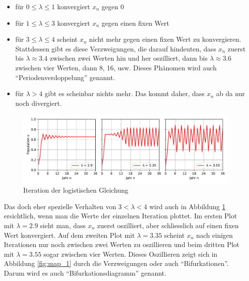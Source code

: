 \begin{itemize}
    \item 
    für $0 \le \lambda \le 1$ konvergiert $x_n$ gegen 0
    \item 
    für $1 \le \lambda \le 3$ konvergiert $x_n$ gegen einen fixen Wert
    \item 
    für $3 \le \lambda \le 4$ scheint $x_n$ nicht mehr gegen einen fixen Wert zu konvergieren.
    Stattdessen gibt es diese Verzweigungen, 
    die darauf hindeuten, 
    dass $x_n$ zuerst bis $\lambda \approx 3.4$ zwischen zwei Werten hin und her oszilliert, 
    dann bis $\lambda \approx 3.6$ zwischen vier Werten, dann 8, 16, usw. 
    Dieses Phänomen wird auch ``Periodenverdoppelung'' genannt.
    \item
    für $\lambda > 4$ gibt es scheinbar nichts mehr.
    Das kommt daher, dass $x_n$ ab da nur noch divergiert.  
\end{itemize}
\begin{figure}
    \includegraphics[width=\linewidth]{papers/logistic/figures/pop_logistic_2.pdf}
    \caption{Iteration der logistischen Gleichung}
    \label{fig:pop_logistic_2}
\end{figure}
Das doch eher spezielle Verhalten von $3 < \lambda < 4$ wird 
auch in Abbildung \ref{fig:pop_logistic_2} ersichtlich,
wenn man die Werte der einzelnen Iteration plottet.
Im ersten Plot mit $\lambda = 2.9$ sieht man, dass $x_n$ zuerst oszilliert,
aber schliesslich auf einen fixen Wert konvergiert.
Auf dem zweiten Plot mit $\lambda = 3.35$ scheint $x_n$ 
nach einigen Iterationen nur noch
zwischen zwei Werten zu oszillieren und beim
dritten Plot mit $\lambda = 3.55$ sogar zwischen vier Werten. 
Dieses Oszillieren zeigt sich in Abbildung \ref{fig:map_1}
durch die Verzweigungen oder auch ``Bifurkationen''. 
Darum wird es auch ``Bifurkationsdiagramm'' genannt. 

